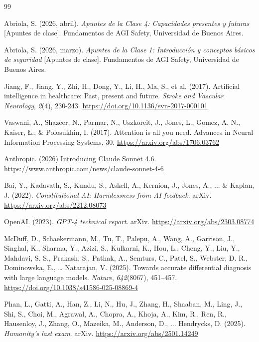 \documentclass[10pt,a4paper]{article}
\begin{document}
\newpage
\begin{thebibliography}{99}

     Abriola, S. (2026, abril). \textit{Apuntes de la Clase 4: Capacidades presentes y futuras} [Apuntes de clase]. Fundamentos de AGI Safety, Universidad de Buenos Aires.

     Abriola, S. (2026, marzo). \textit{Apuntes de la Clase 1: Introducción y conceptos básicos de seguridad} [Apuntes de clase]. Fundamentos de AGI Safety, Universidad de Buenos Aires.
    
     Jiang, F., Jiang, Y., Zhi, H., Dong, Y., Li, H., Ma, S., et al. (2017). Artificial intelligence in healthcare: Past, present and future. \textit{Stroke and Vascular Neurology}, \textit{2}(4), 230-243. \url{https://doi.org/10.1136/svn-2017-000101}

     Vaswani, A., Shazeer, N., Parmar, N., Uszkoreit, J., Jones, L., Gomez, A. N., Kaiser, Ł., \& Polosukhin, I. (2017). Attention is all you need. Advances in Neural Information Processing Systems, 30. \url{https://arxiv.org/abs/1706.03762}

     Anthropic. (2026) Introducing Claude Sonnet 4.6. \url{https://www.anthropic.com/news/claude-sonnet-4-6}

     Bai, Y., Kadavath, S., Kundu, S., Askell, A., Kernion, J., Jones, A., ... \& Kaplan, J. (2022). \textit{Constitutional AI: Harmlessness from AI feedback}. arXiv. \url{https://arxiv.org/abs/2212.08073}


    
     OpenAI. (2023). \textit{GPT-4 technical report}. arXiv. \url{https://arxiv.org/abs/2303.08774}


    
     McDuff, D., Schaekermann, M., Tu, T., Palepu, A., Wang, A., Garrison, J., Singhal, K., Sharma, Y., Azizi, S., Kulkarni, K., Hou, L., Cheng, Y., Liu, Y., Mahdavi, S. S., Prakash, S., Pathak, A., Semturs, C., Patel, S., Webster, D. R., Dominowska, E., … Natarajan, V. (2025). Towards accurate differential diagnosis with large language models. \textit{Nature}, \textit{642}(8067), 451–457. \url{https://doi.org/10.1038/s41586-025-08869-4}

    
     Phan, L., Gatti, A., Han, Z., Li, N., Hu, J., Zhang, H., Shaaban, M., Ling, J., Shi, S., Choi, M., Agrawal, A., Chopra, A., Khoja, A., Kim, R., Ren, R., Hausenloy, J., Zhang, O., Mazeika, M., Anderson, D., ... Hendrycks, D. (2025). \textit{Humanity's last exam}. arXiv. \url{https://arxiv.org/abs/2501.14249}


\end{thebibliography}
\end{document}
